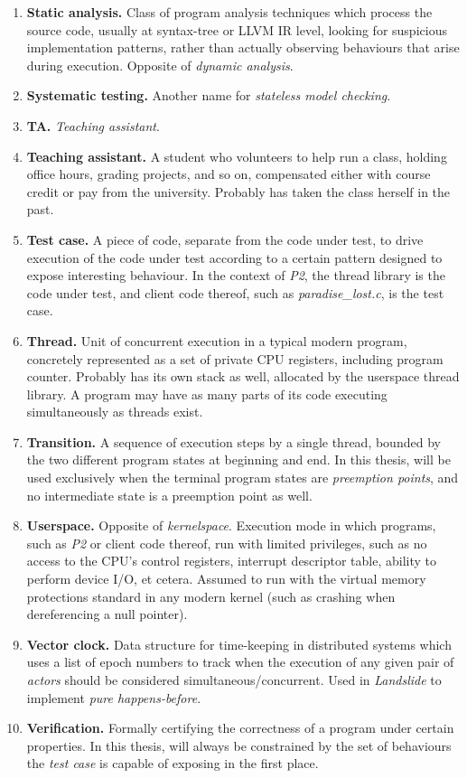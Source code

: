 \begin{enumerate}
	\item {\bf Static analysis.}
		Class of program analysis techniques which process the source code,
		usually at syntax-tree or LLVM IR level,
		looking for suspicious implementation patterns,
		rather than actually observing behaviours that arise during execution.
		Opposite of {\em dynamic analysis}.
	\item {\bf Systematic testing.}
		Another name for {\em stateless model checking}.
	\item {\bf TA.} {\em Teaching assistant}.
	\item {\bf Teaching assistant.}
		A student who volunteers to help run a class, holding office hours, grading projects, and so on,
		compensated either with course credit or pay from the university.
		Probably has taken the class herself in the past.
	\item {\bf Test case.}
		A piece of code, separate from the code under test,
		to drive execution of the code under test according to a certain pattern designed to expose interesting behaviour.
		In the context of {\em P2}, the thread library is the code under test,
		and client code thereof, such as {\em paradise\_lost.c}, is the test case.
	\item {\bf Thread.}
		Unit of concurrent execution in a typical modern program,
		concretely represented as a set of private CPU registers, including program counter.
		Probably has its own stack as well, allocated by the userspace thread library.
		A program may have as many parts of its code executing simultaneously as threads exist.
	\item {\bf Transition.}
		A sequence of execution steps by a single thread,
		bounded by the two different program states at beginning and end.
		In this thesis, will be used exclusively when the terminal program states are {\em preemption points},
		and no intermediate state is a preemption point as well.
	\item {\bf Userspace.}
		Opposite of {\em kernelspace}.
		Execution mode in which programs, such as {\em P2} or client code thereof,
		run with limited privileges,
		such as no access to the CPU's control registers, interrupt descriptor table, ability to perform device I/O,
		et cetera.
		Assumed to run with the virtual memory protections standard in any modern kernel
		(such as crashing when dereferencing a null pointer).
	\item {\bf Vector clock.}
		Data structure for time-keeping in distributed systems which uses a list of epoch numbers
		to track when the execution of any given pair of {\em actors} should be considered simultaneous/concurrent.
		Used in {\em Landslide} to implement {\em pure happens-before}.
	\item {\bf Verification.}
		Formally certifying the correctness of a program under certain properties.
		In this thesis, will always be constrained by the set of behaviours
		the {\em test case} is capable of exposing in the first place.
\end{enumerate}
